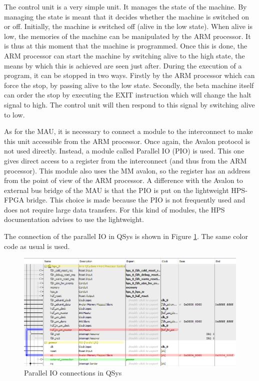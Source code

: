 The control unit is a very simple unit. It manages the state of the machine. By managing the state is meant that 
it decides whether the machine is switched on or off. Initially, the machine is switched off (alive 
in the low state). When alive is low, the memories of the machine can be manipulated by the ARM 
processor. It is thus at this moment that the machine is programmed. Once this is done, the ARM 
processor can start the machine by switching alive to the high state, the means by which this is 
achieved are seen just after. During the execution of a program, it can be stopped in two ways. 
Firstly by the ARM processor which can force the stop, by passing alive to the low state. Secondly, 
the beta machine itself can order the stop by executing the EXIT instruction which will change the 
halt signal to high. The control unit will then respond to this signal by switching alive to low.

As for the MAU, it is necessary to connect a module to the interconnect to make this unit 
accessible from the ARM processor. Once again, the Avalon protocol is not used directly. 
Instead, a module called Parallel IO (PIO) is used. This one gives direct access to a register 
from the interconnect (and thus from the ARM processor). This module also uses the MM avalon, so 
the register has an address from the point of view of the ARM processor. A difference with 
the Avalon to external bus bridge of the MAU is that the PIO is put on the lightweight HPS-FPGA 
bridge. This choice is made because the PIO is not frequently used and does not require large data 
transfers. For this kind of modules, the HPS documentation advises to use the lightweight.

The connection of the parallel IO in QSys is shown in Figure \ref{fig:qsys/ctrlu}. The same color 
code as usual is used.

\begin{figure}[ht!]
    \center
    \includegraphics[width=\linewidth]{"Chapter5-MAU_CTRLU/res/qsys_ctrlu.PNG"}
    \caption{Parallel IO connections in QSys}
    \label{fig:qsys/ctrlu}
\end{figure}


